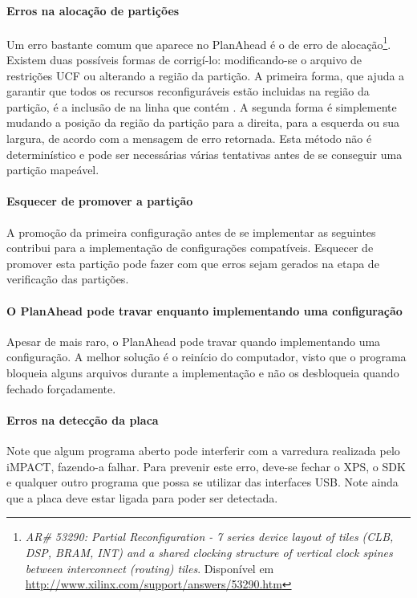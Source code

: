 \documentclass[11pt,a4paper,oneside]{book}
\begin{document}
\paragraph{Erros na alocação de partições}
Um erro bastante comum que aparece no PlanAhead é o de erro de alocação\footnote{\textit{AR\# 53290: Partial Reconfiguration - 7 series device layout of tiles (CLB, DSP, BRAM, INT) and a shared clocking structure of vertical clock spines between interconnect (routing) tiles}. Disponível em \url{http://www.xilinx.com/support/answers/53290.htm}}.
Existem duas possíveis formas de corrigí-lo: modificando-se o arquivo de restrições UCF ou alterando a região da partição.
A primeira forma, que ajuda a garantir que todos os recursos reconfiguráveis estão incluidas na região da partição, é a inclusão de  na linha que contém .
A segunda forma é simplemente mudando a posição da região da partição para a direita, para a esquerda ou sua largura, de acordo com a mensagem de erro retornada.
Esta método não é determinístico e pode ser necessárias várias tentativas antes de se conseguir uma partição mapeável. 

\paragraph{Esquecer de promover a partição}
A promoção da primeira configuração antes de se implementar as seguintes contribui para a implementação de configurações compatíveis.
Esquecer de promover esta partição pode fazer com que erros sejam gerados na etapa de verificação das partições.

\paragraph{O PlanAhead pode travar enquanto implementando uma configuração}
Apesar de mais raro, o PlanAhead pode travar quando implementando uma configuração.
A melhor solução é o reinício do computador, visto que o programa bloqueia alguns arquivos durante a implementação e não os desbloqueia quando fechado forçadamente.

\paragraph{Erros na detecção da placa}
Note que algum programa aberto pode interferir com a varredura realizada pelo iMPACT, fazendo-a falhar.
Para prevenir este erro, deve-se fechar o XPS, o SDK e qualquer outro programa que possa se utilizar das interfaces USB.
Note ainda que a placa deve estar ligada para poder ser detectada.
\end{document}
